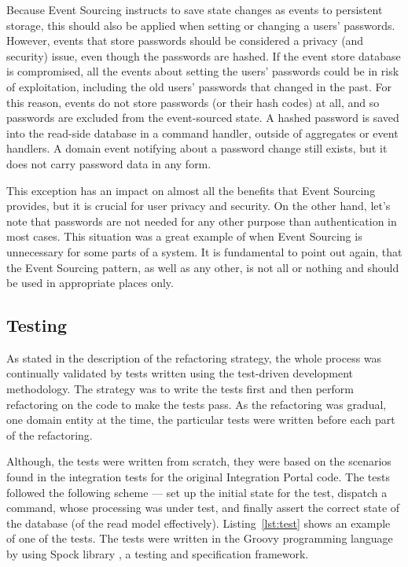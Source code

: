 \documentclass{book}
\begin{document}
Because Event Sourcing instructs to save state changes as events to
persistent storage, this should also be applied when setting or changing
a users' passwords. However, events that store passwords should be
considered a privacy (and security) issue, even though the passwords are
hashed. If the event store database is compromised, all the events about
setting the users' passwords could be in risk of exploitation, including
the old users' passwords that changed in the past. For this reason,
events do not store passwords (or their hash codes) at all, and so
passwords are excluded from the event-sourced state. A hashed password
is saved into the read-side database in a command handler, outside of
aggregates or event handlers. A domain event notifying about a password
change still exists, but it does not carry password data in any form.

This exception has an impact on almost all the benefits that Event
Sourcing provides, but it is crucial for user privacy and security. On
the other hand, let's note that passwords are not needed for any other
purpose than authentication in most cases. This situation was a great
example of when Event Sourcing is unnecessary for some parts of a
system. It is fundamental to point out again, that the Event Sourcing
pattern, as well as any other, is not all or nothing and should be used
in appropriate places only.


\subsection{Testing}\label{testing}

As stated in the description of the refactoring strategy, the whole
process was continually validated by tests written using the test-driven
development methodology. The strategy was to write the tests first and
then perform refactoring on the code to make the tests pass. As the
refactoring was gradual, one domain entity at the time, the particular
tests were written before each part of the refactoring.

Although, the tests were written from scratch, they were based on the
scenarios found in the integration tests for the original Integration
Portal code. The tests followed the following scheme --- set up the
initial state for the test, dispatch a command, whose processing was
under test, and finally assert the correct state of the database (of the
read model effectively). Listing~\ref{lst:test} shows an
example of one of the tests. The tests were written in the Groovy
programming language \cite{groovy} by using Spock library \cite{spock},
a testing and specification framework.
\end{document}
